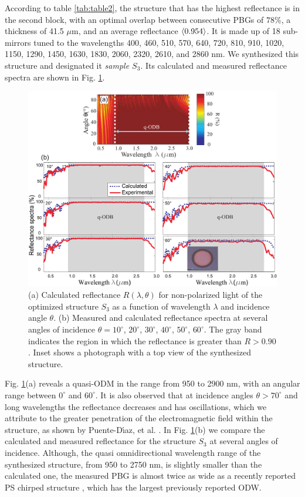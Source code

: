 \documentclass[a4paper,fleqn]{cas-sc}
\begin{document}
According to table \ref{tab:table2}, the structure that has the highest
reflectance is in the second block, with an optimal overlap between
consecutive PBGs of $78\%$, a thickness of
41.5 $\mu$m, and an average reflectance $\braket{0.954}$. It is made up
of 18 sub-mirrors tuned to the wavelengths
400, 460, 510, 570, 640, 720, 810, 910, 1020, 1150, 1290, 1450,
1630, 1830, 2060, 2320, 2610, and 2860 nm.
We synthesized this structure and designated it {\em sample $S_3$}.
Its calculated and measured
reflectance spectra are shown in Fig. \ref{Fig3}.
\begin{figure}
        \begin{center}
                \includegraphics[width=\textwidth]
                {F3Alternativa.pdf}
        \end{center}
        \caption{ (a) Calculated reflectance $R(\lambda,\theta)$ for non-polarized light of the optimized structure $S_3$
                as a function of wavelength $\lambda$ and incidence angle
                $\theta$. (b) Measured and calculated reflectance spectra at several
                angles of incidence $\theta=10^\circ$, $20^\circ$,
                $30^\circ$, $40^\circ$, $50^\circ$, $60^\circ$. The gray band indicates
                the region in which the reflectance is greater than $R>0.90$.  Inset shows a
                photograph with a top view of the synthesized structure.}
        \label{Fig3}
\end{figure}

Fig. \ref{Fig3}(a) reveals a quasi-ODM
in the range from 950 to 2900 nm, with an angular range between $0^\circ$ and
$60^\circ$. It is also observed that at incidence angles $\theta
>70^\circ$ and long
wavelengths the reflectance decreases and has oscillations, which we attribute to the
greater penetration of the electromagnetic field within the structure, as shown by
Puente-D\'{\i}az, et al. \cite{Puente2020}. In Fig. \ref{Fig3}(b) we compare the
calculated and measured reflectance for the structure $S_3$ at several angles of
incidence. Although, the quasi omnidirectional wavelength range of
the synthesized structure, from 950 to 2750 nm, is slightly smaller than the calculated
one, the measured PBG is almost twice as wide
as a recently reported PS chirped structure \cite{Chavez2020}, which
has the largest previously reported ODW.
\end{document}
